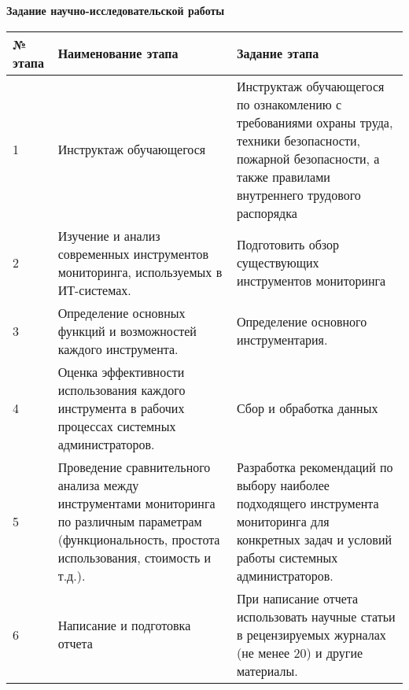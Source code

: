  \hypertarget{app-a}{\label{app-a}}

\textbf{Задание научно-исследовательской работы}
\vspace{\baselineskip}

\begin{longtable}{|l|p{4cm}|p{6cm}|}
    \hline
    № этапа & Наименование этапа                                                                                                                                      & Задание этапа                                                                                                                                                        \\ \hline
    1       & Инструктаж обучающегося                                                                                                                                 & Инструктаж обучающегося по ознакомлению с требованиями охраны труда, техники безопасности, пожарной безопасности, а также правилами внутреннего трудового распорядка \\ \hline
    2       & Изучение и анализ современных инструментов мониторинга, используемых в ИТ-системах.                                                                     & Подготовить обзор существующих инструментов мониторинга                                                                                                              \\ \hline
    3       & Определение основных функций и возможностей каждого инструмента.                                                                                        & Определение основного инструментария.                                                                                                                                \\ \hline
    4       & Оценка эффективности использования каждого инструмента в рабочих процессах системных администраторов.                                                   & Сбор и обработка данных                                                                                                                                              \\ \hline
    5       & Проведение сравнительного анализа между инструментами мониторинга по различным параметрам (функциональность, простота использования, стоимость и т.д.). & Разработка рекомендаций по выбору наиболее подходящего инструмента мониторинга для конкретных задач и условий работы системных администраторов.                      \\ \hline
    6       & Написание и подготовка отчета                                                                                                                           & При написание отчета использовать научные статьи в рецензируемых журналах (не менее 20) и другие материалы.                                                          \\ \hline
\end{longtable}
\clearpage
